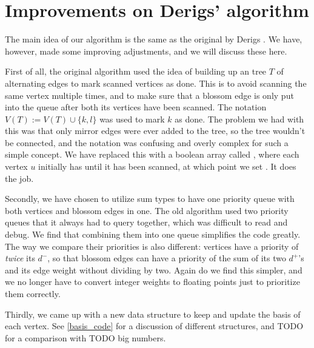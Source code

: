 \section{Improvements on Derigs' algorithm}
The main idea of our algorithm is the same as the original by Derigs \cite{derigs_shortest_odd_path}. We have, however, made some improving adjustments, and we will discuss these here.

First of all, the original algorithm used the idea of building up an tree $T$ of alternating edges to mark scanned vertices as done. This is to avoid scanning the same vertex multiple times, and to make sure that a blossom edge is only put into the queue after both its vertices have been scanned. The notation $V(T) := V(T) \cup \{k,l\}$ was used to mark $k$ as done. The problem we had with this was that only mirror edges were ever added to the tree, so the tree wouldn't be connected, and the notation was confusing and overly complex for such a simple concept. We have replaced this with a boolean array called , where each vertex $u$ initially has  until it has been scanned, at which point we set . It does the job.

Secondly, we have chosen to utilize sum types to have one priority queue with both vertices and blossom edges in one. The old algorithm used two priority queues that it always had to query together, which was difficult to read and debug. We find that combining them into one queue simplifies the code greatly. The way we compare their priorities is also different: vertices have a priority of \emph{twice} its $d^-$, so that blossom edges can have a priority of the sum of its two $d^+$'s and its edge weight without dividing by two. Again do we find this simpler, and we no longer have to convert integer weights to floating points just to prioritize them correctly.

Thirdly, we came up with a new data structure to keep and update the basis of each vertex. See \ref{basis_code} for a discussion of different structures, and TODO for a comparison with TODO big numbers.
